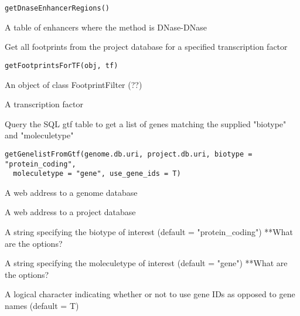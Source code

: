 \documentclass[a4paper]{book}
\begin{document}
%
\begin{Usage}
\begin{verbatim}
getDnaseEnhancerRegions()
\end{verbatim}
\end{Usage}
%
\begin{Value}
A table of enhancers where the method is DNase-DNase
\end{Value}
%
\begin{Description}\relax
Get all footprints from the project database for a specified transcription factor
\end{Description}
%
\begin{Usage}
\begin{verbatim}
getFootprintsForTF(obj, tf)
\end{verbatim}
\end{Usage}
%
\begin{Arguments}
\begin{ldescription}
\item[\code{obj}] An object of class FootprintFilter (??)

\item[\code{tf}] A transcription factor
\end{ldescription}
\end{Arguments}
%
\begin{Description}\relax
Query the SQL gtf table to get a list of genes matching the supplied "biotype" and "moleculetype"
\end{Description}
%
\begin{Usage}
\begin{verbatim}
getGenelistFromGtf(genome.db.uri, project.db.uri, biotype = "protein_coding",
  moleculetype = "gene", use_gene_ids = T)
\end{verbatim}
\end{Usage}
%
\begin{Arguments}
\begin{ldescription}
\item[\code{genome.db.uri}] A web address to a genome database

\item[\code{project.db.uri}] A web address to a project database

\item[\code{biotype}] A string specifying the biotype of interest (default = "protein\_coding") **What are the options?

\item[\code{moleculetype}] A string specifying the moleculetype of interest (default = "gene") **What are the options?

\item[\code{use\_gene\_ids}] A logical character indicating whether or not to use gene IDs as opposed to gene names (default = T)
\end{ldescription}
\end{Arguments}
\end{document}
